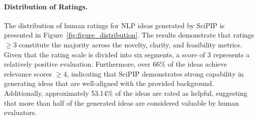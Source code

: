 \documentclass{article}
\theoremstyle{plain}
\theoremstyle{definition}
\theoremstyle{remark}
\begin{document}
\paragraph{Distribution of Ratings.} The distribution of human ratings for NLP ideas generated by SciPIP is presented in Figure~\ref{fig:figure_distribution}. The results demonstrate that ratings $\ge 3$ constitute the majority across the novelty, clarity, and feasibility metrics. Given that the rating scale is divided into six segments, a score of $3$ represents a relatively positive evaluation. Furthermore, over 66\% of the ideas achieve relevance scores $\ge 4$, indicating that SciPIP demonstrates strong capability in generating ideas that are well-aligned with the provided background. Additionally, approximately 53.14\% of the ideas are rated as helpful, suggesting that more than half of the generated ideas are considered valuable by human evaluators.


\vspace{-2mm}
\end{document}
